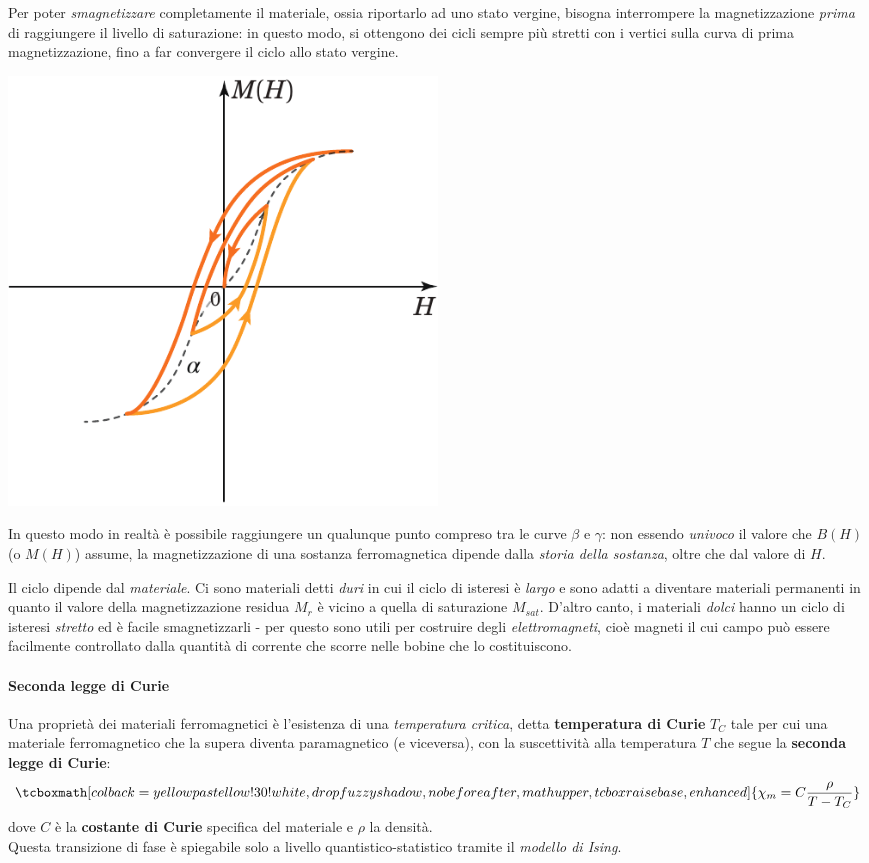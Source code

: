 Per poter \textit{smagnetizzare} completamente il materiale, ossia riportarlo ad uno stato vergine, bisogna interrompere la magnetizzazione \textit{prima} di raggiungere il livello di saturazione: in questo modo, si ottengono dei cicli sempre più stretti con i vertici sulla curva di prima magnetizzazione, fino a far convergere il ciclo allo stato vergine.
	\begin{center}
	\includegraphics[width=0.5\textwidth]{images/chp12/chp12ferromagnetigraf3.pdf}
\end{center}
In questo modo in realtà è possibile raggiungere un qualunque punto compreso tra le curve $\beta$ e $\gamma$: non essendo \textit{univoco} il valore che $B(H)$ (o $M(H)$) assume, la magnetizzazione di una sostanza ferromagnetica dipende dalla \textit{storia della sostanza}, oltre che dal valore di $H$.
\begin{observe}
	Il ciclo dipende dal \textit{materiale}. Ci sono materiali detti \textit{duri} in cui il ciclo di isteresi è \textit{largo} e sono adatti a diventare materiali permanenti in quanto il valore della magnetizzazione residua $M_r$ è vicino a quella di saturazione $M_{sat}$. D'altro canto, i materiali \textit{dolci} hanno un ciclo di isteresi \textit{stretto} ed è facile smagnetizzarli - per questo sono utili per costruire degli \textit{elettromagneti}, cioè magneti il cui campo può essere facilmente controllato dalla quantità di corrente che scorre nelle bobine che lo costituiscono.
\end{observe}
\paragraph{Seconda legge di Curie}
Una proprietà dei materiali ferromagnetici è l'esistenza di una \textit{temperatura critica}, detta \textbf{temperatura di Curie} $T_C$ tale per cui una materiale ferromagnetico che la supera diventa paramagnetico (e viceversa), con la suscettività alla temperatura $T$ che segue la \textbf{seconda legge di Curie}:
\begin{equation}
		\tcboxmath[colback=yellowpastellow!30!white,drop fuzzy shadow, nobeforeafter, math upper, tcbox raise base, enhanced]{\chi_m=C\frac{\rho}{T-T_C}}
\end{equation}
dove $C$ è la \textbf{costante di Curie} specifica del materiale e $\rho$ la densità.\\
Questa transizione di fase è spiegabile solo a livello quantistico-statistico tramite il \textit{modello di Ising}.